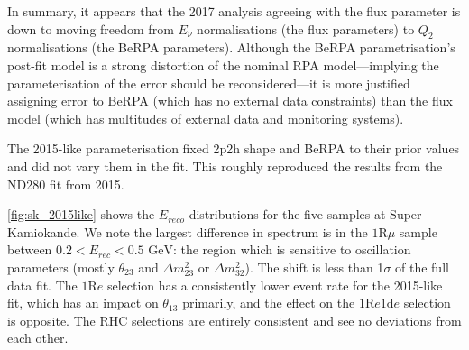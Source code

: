 In summary, it appears that the 2017 analysis agreeing with the flux parameter is down to moving freedom from $E_\nu$ normalisations (the flux parameters) to $Q_2$ normalisations (the BeRPA parameters). Although the BeRPA parametrisation's post-fit model is a strong distortion of the nominal RPA model---implying the parameterisation of the error should be reconsidered---it is more justified assigning error to BeRPA (which has no external data constraints) than the flux model (which has multitudes of external data and monitoring systems).

The 2015-like parameterisation fixed 2p2h shape and BeRPA to their prior values and did not vary them in the fit. This roughly reproduced the results from the ND280 fit from 2015\cite{t2k_2015}. 

\autoref{fig:sk_2015like} shows the $E_{reco}$ distributions for the five samples at Super-Kamiokande. We note the largest difference in spectrum is in the $1\text{R}\mu$ sample between $0.2 < E_{rec} < 0.5\text{ GeV}$: the region which is sensitive to oscillation parameters (mostly $\theta_{23}$ and $\Delta m^2_{23}$ or $\Delta m^2_{32}$). The shift is less than 1$\sigma$ of the full data fit. The $1\text{R}e$ selection has a consistently lower event rate for the 2015-like fit, which has an impact on $\theta_{13}$ primarily, and the effect on the $1\text{R}e1\text{d}e$ selection is opposite. The RHC selections are entirely consistent and see no deviations from each other.
